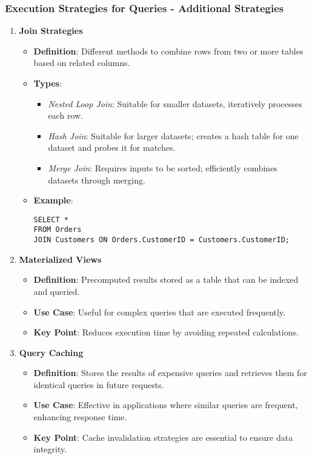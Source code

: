 \documentclass[aspectratio=169]{beamer}
\begin{document}
\begin{frame}[fragile]
    \frametitle{Execution Strategies for Queries - Additional Strategies}
    \begin{enumerate}[resume]
        \item \textbf{Join Strategies}
        \begin{itemize}
            \item \textbf{Definition}: Different methods to combine rows from two or more tables based on related columns.
            \item \textbf{Types}:
            \begin{itemize}
                \item \textit{Nested Loop Join}: Suitable for smaller datasets, iteratively processes each row.
                \item \textit{Hash Join}: Suitable for larger datasets; creates a hash table for one dataset and probes it for matches.
                \item \textit{Merge Join}: Requires inputs to be sorted; efficiently combines datasets through merging.
            \end{itemize}
            \item \textbf{Example}:
            \begin{lstlisting}
SELECT * 
FROM Orders 
JOIN Customers ON Orders.CustomerID = Customers.CustomerID;
            \end{lstlisting}
        \end{itemize}

        \item \textbf{Materialized Views}
        \begin{itemize}
            \item \textbf{Definition}: Precomputed results stored as a table that can be indexed and queried.
            \item \textbf{Use Case}: Useful for complex queries that are executed frequently.
            \item \textbf{Key Point}: Reduces execution time by avoiding repeated calculations.
        \end{itemize}

        \item \textbf{Query Caching}
        \begin{itemize}
            \item \textbf{Definition}: Stores the results of expensive queries and retrieves them for identical queries in future requests.
            \item \textbf{Use Case}: Effective in applications where similar queries are frequent, enhancing response time.
            \item \textbf{Key Point}: Cache invalidation strategies are essential to ensure data integrity.
        \end{itemize}
    \end{enumerate}
\end{frame}
\end{document}
